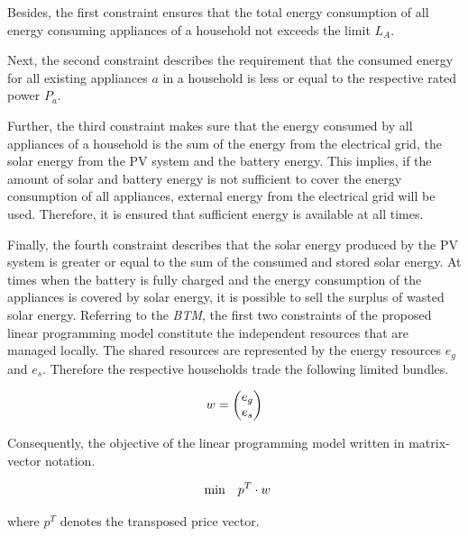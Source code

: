 Besides, the first constraint ensures that the total energy consumption of all energy consuming
appliances of a household not exceeds the limit $L_{A}$. 

Next, the second constraint describes the requirement that the consumed energy
for all existing appliances $a$ in a household is less or equal 
to the respective rated power $P_{a}$.

Further, the third constraint makes sure that the energy consumed by all appliances
of a household is the sum of the energy from the electrical grid, the solar energy from 
the PV system and the battery energy. This implies, if the amount of solar and battery 
energy is not sufficient to cover the energy consumption of all appliances, external 
energy from the electrical grid will be used. Therefore, it is ensured 
that sufficient energy is available at all times.

Finally, the fourth constraint describes that the solar energy produced by the PV system 
is greater or equal to the sum of the consumed and stored solar energy. 
At times when the battery is fully charged and the energy consumption of the 
appliances is covered by solar energy, it is possible to sell the surplus of 
wasted solar energy.
Referring to the \textit{BTM}, the first two constraints of the proposed linear
programming model constitute the independent resources that are managed locally.
The shared resources are represented by 
the energy resources $e_{g}$ and $e_{s}$.
Therefore the respective households trade the following limited bundles.

\begin{equation*}
    \begin{array}{ll@{}ll}
		w = 
		\begin{pmatrix}
			e_{g} \\
			e_{s}
		\end{pmatrix}
    \end{array}
\end{equation*}

Consequently, the objective of the linear programming 
model written in matrix-vector notation.

\begin{equation*}
    \begin{array}{ll@{}ll}
		\text{min}  & \displaystyle p^{T} \cdot w
    \end{array}
\end{equation*}

where $p^{T}$ denotes the transposed price vector.

